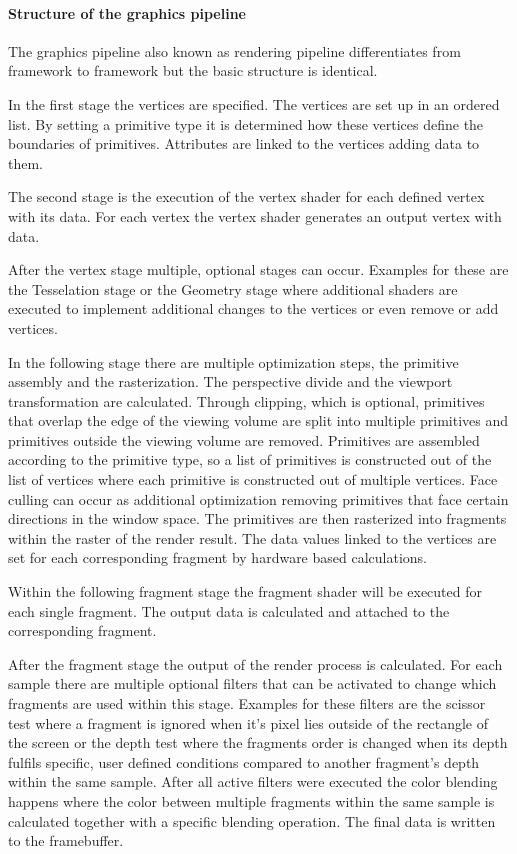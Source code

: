 \paragraph{Structure of the graphics pipeline}
\label{paragraph:pipeline}

The graphics pipeline also known as rendering pipeline differentiates from framework to framework but the basic structure is identical.

In the first stage the vertices are specified. The vertices are set up in an ordered list. By setting a primitive type it is determined how these vertices define the boundaries of primitives. Attributes are linked to the vertices adding data to them.

The second stage is the execution of the vertex shader for each defined vertex with its data. For each vertex the vertex shader generates an output vertex with data.

After the vertex stage multiple, optional stages can occur. Examples for these are the Tesselation stage or the Geometry stage where additional shaders are executed to implement additional changes to the vertices or even remove or add vertices.

In the following stage there are multiple optimization steps, the primitive assembly and the rasterization. The perspective divide and the viewport transformation are calculated. Through clipping, which is optional, primitives that overlap the edge of the viewing volume are split into multiple primitives and primitives outside the viewing volume are removed. Primitives are assembled according to the primitive type, so a list of primitives is constructed out of the list of vertices where each primitive is constructed out of multiple vertices. Face culling can occur as additional optimization removing primitives that face certain directions in the window space. The primitives are then rasterized into fragments within the raster of the render result. The data values linked to the vertices are set for each corresponding fragment by hardware based calculations.

Within the following fragment stage the fragment shader will be executed for each single fragment. The output data is calculated and attached to the corresponding fragment.

After the fragment stage the output of the render process is calculated. For each sample there are multiple optional filters that can be activated to change which fragments are used within this stage. Examples for these filters are the scissor test where a fragment is ignored when it's pixel lies outside of the rectangle of the screen or the depth test where the fragments order is changed when its depth fulfils specific, user defined conditions compared to another fragment's depth within the same sample. After all active filters were executed the color blending happens where the color between multiple fragments within the same sample is calculated together with a specific blending operation. The final data is written to the framebuffer.

